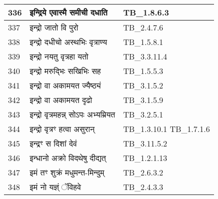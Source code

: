 \documentclass[17pt]{extarticle}
\begin{document}
\begin{longtable}{||p{0.4in}||p{4.9in}||p{0.9in}||}
    \hline
        
    336 & इन्द्रिये एवास्मै समीची दधाति & TB\_1.8.6.3       \\
    
    \hline
        
    337 & इन्द्रो जातो वि पुरो & TB\_2.4.7.6       \\
    
    \hline
        
    338 & इन्द्रो दधीचो अस्थभिः वृत्राण्य & TB\_1.5.8.1       \\
    
    \hline
        
    339 & इन्द्रो नयतु वृत्रहा यतो & TB\_3.3.11.4       \\
    
    \hline
        
    340 & इन्द्रो मरुद्भिः सखिभिः सह & TB\_1.5.5.3       \\
    
    \hline
        
    341 & इन्द्रो वा अकामयत ज्यैष्ठ्यं & TB\_3.1.5.2       \\
    
    \hline
        
    342 & इन्द्रो वा अकामयत दृढो & TB\_3.1.5.9       \\
    
    \hline
        
    343 & इन्द्रो वृत्रमहन्न् सोऽपः अभ्यम्रियत & TB\_3.2.5.1       \\
    
    \hline
        
    344 & इन्द्रो वृत्रꣳ हत्वा असुरान् & TB\_1.3.10.1 TB\_1.7.1.6       \\
    
    \hline
        
    345 & इन्द्रꣳ स दिशां देवं & TB\_3.11.5.2       \\
    
    \hline
        
    346 & इन्धानो अक्रो विदथेषु दीद्यत् & TB\_1.2.1.13       \\
    
    \hline
        
    347 & इमं तꣳ शुक्रं मधुमन्त{-}मिन्दुम् & TB\_2.6.3.2       \\
    
    \hline
        
    348 & इमं नो यज्ञ्ं ॅविहवे & TB\_2.4.3.3       \\
    

\end{longtable}
\end{document}
